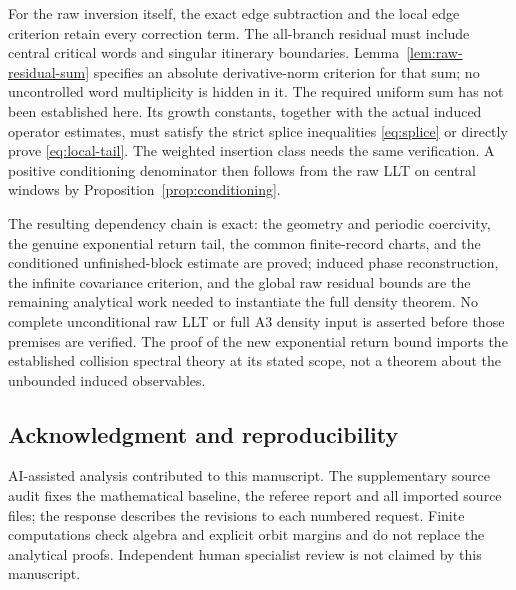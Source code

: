 For the raw inversion itself, the exact edge subtraction and the local
edge criterion retain every correction term. The all-branch residual
must include central critical words and singular itinerary boundaries.
Lemma~\ref{lem:raw-residual-sum} specifies an absolute derivative-norm
criterion for that sum; no uncontrolled word multiplicity is hidden in
it. The required uniform sum has not been established here. Its growth
constants, together with the actual induced operator estimates, must
satisfy the strict splice inequalities \eqref{eq:splice} or directly
prove \eqref{eq:local-tail}. The weighted insertion class needs the same
verification. A positive conditioning denominator then follows from the
raw LLT on central windows by Proposition~\ref{prop:conditioning}.

The resulting dependency chain is exact: the geometry and periodic
coercivity, the genuine exponential return tail, the common finite-record
charts, and the conditioned unfinished-block estimate are proved;
induced phase reconstruction, the infinite covariance criterion, and
the global raw residual bounds are the remaining analytical work needed
to instantiate the full density theorem. No complete unconditional raw
LLT or full A3 density input is asserted before those premises are
verified. The proof of the new exponential return bound imports the
established collision spectral theory at its stated scope, not a theorem
about the unbounded induced observables.

\subsection*{Acknowledgment and reproducibility}
AI-assisted analysis contributed to this manuscript. The supplementary
source audit fixes the mathematical baseline, the referee report and
all imported source files; the response describes the revisions to each
numbered request. Finite computations check algebra and explicit orbit
margins and do not replace the analytical proofs. Independent human
specialist review is not claimed by this manuscript.
